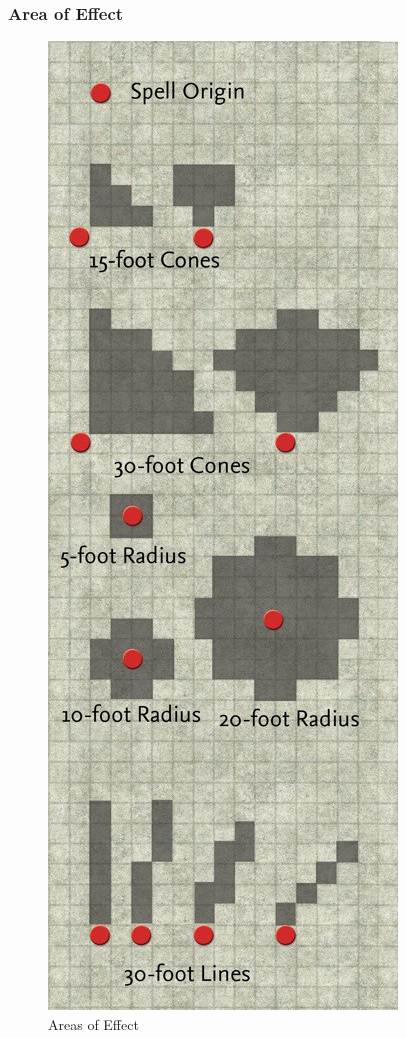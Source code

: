 \documentclass[12pt,a4paper]{report}
\begin{document}
			\subsubsection{Area of Effect}
				\begin{figure}
					\includegraphics[scale=0.25]{AOE}
					\caption{Areas of Effect}
					\label{fig: Areas of Effect}
				\end{figure}
\end{document}
